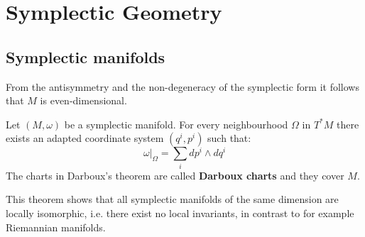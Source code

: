 \chapter{Symplectic Geometry}\label{chapter:symplectic}
\section{Symplectic manifolds}

	
	\begin{property}[Dimension]
		From the antisymmetry and the non-degeneracy of the symplectic form it follows that $M$ is even-dimensional.
	\end{property}
	
	\begin{theorem}[Darboux]
		Let $(M, \omega)$ be a symplectic manifold. For every neighbourhood $\Omega$ in $T^*M$ there exists an adapted coordinate system $(q^i, p^i)$ such that:
		\begin{equation}
			\left.\omega\right|_\Omega = \sum_idp^i\wedge dq^i
		\end{equation}		
		{\normalfont The charts in Darboux's theorem are called \textbf{Darboux charts} and they cover $M$.}
	\end{theorem}
	\begin{remark}
		This theorem shows that all symplectic manifolds of the same dimension are locally isomorphic, i.e. there exist no local invariants, in contrast to for example Riemannian manifolds.
	\end{remark}
	
